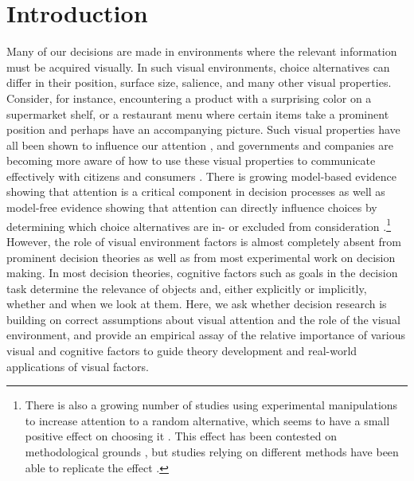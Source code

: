 
\section{Introduction}

Many of our decisions are made in environments where the relevant information must be acquired visually. In such visual environments, choice alternatives can differ in their position, surface size, salience, and many other visual properties. Consider, for instance, encountering a product with a surprising color on a supermarket shelf, or a restaurant menu where certain items take a prominent position and perhaps have an accompanying picture. Such visual properties have all been shown to influence our attention \citep{corbetta2002a,borji2012a,dehaene2003a,clarke2014a, rosenholtz2007a}, and governments and companies are becoming more aware of how to use these visual properties to communicate effectively with citizens and consumers \citep{orquinwedel2020}. There is growing model-based evidence showing that attention is a critical component in decision processes \citep{krajbich2010a, stojic2020uncertainty, callaway2019a, gluth2018, gluth2020} as well as model-free evidence showing that attention can directly influence choices by determining which choice alternatives are in- or excluded from consideration \citep{chandon2009a, gidlof2013, gidloef2017a}.\footnote{There is also a growing number of studies using experimental manipulations to increase attention to a random alternative, which seems to have a small positive effect on choosing it \citep{armel2008, paernamets2015a, shimojo2003a}. This effect has been contested on methodological grounds \citep{Newell2018, ghaffari2018a}, but studies relying on different methods have been able to replicate the effect \citep{liu2020a, Fisher2020}.} However, the role of visual environment factors is almost completely absent from prominent decision theories as well as from most experimental work on decision making. In most decision theories, cognitive factors such as goals in the decision task determine the relevance of objects and, either explicitly or implicitly, whether and when we look at them. Here, we ask whether decision research is building on correct assumptions about visual attention and the role of the visual environment, and provide an empirical assay of the relative importance of various visual and cognitive factors to guide theory development and real-world applications of visual factors.\\

